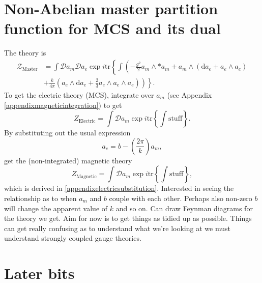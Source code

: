 \documentclass{article}
\begin{document}
\section{Non-Abelian master partition function for MCS and its dual}
The theory is
\begin{align}
    \label{Eq: Master equation}
    \mathcal{Z}_{\text{Master}}&= \int \mathcal{D}a_{m}\mathcal{D}a_{e}\exp i \text{tr}\left\{\int \left(-\frac{g^{2}}{2}a_{m}\wedge * a_{m} \right.\right. + a_{m}\wedge \left(\mathrm{d}a_{e} + a_{e}\wedge a_{e} \right) \nonumber \\
    &+ \left.\left.\frac{k}{4\pi}\left(a_{e}\wedge \mathrm{d}a_{e} + \frac{2}{3}a_{e}\wedge a_{e}\wedge a_{e} \right)\right)\right\}.
\end{align}
To get the electric theory (MCS), integrate over $a_{m}$ (see Appendix \ref{appendixmagneticintegration}) to get
\begin{equation}
    Z_{\text{Electric}} = \int \mathcal{D}a_{m}\exp i \text{tr}\left\{\int \text{stuff}\right\}.
\end{equation}
By substituting out the usual expression
\begin{equation}
    a_{e} = b - \left(\frac{2\pi}{k} \right)a_{m}, 
\end{equation}
get the (non-integrated) magnetic theory
\begin{equation}
    Z_{\text{Magnetic}} = \int \mathcal{D}a_{m}\exp i \text{tr}\left\{\int \text{stuff}\right\},
\end{equation}
which is derived in \ref{appendixelectricsubstitution}. Interested in seeing the relationship as to when $a_{m}$ and $b$ couple with each other. Perhaps also non-zero $b$ will change the apparent value of $k$ and so on. Can draw Feynman diagrams for the theory we get. Aim for now is to get things as tidied up as possible. Things can get really confusing as to understand what we're looking at we must understand strongly coupled gauge theories. 




\section{Later bits}





\appendix
\newpage
\end{document}
